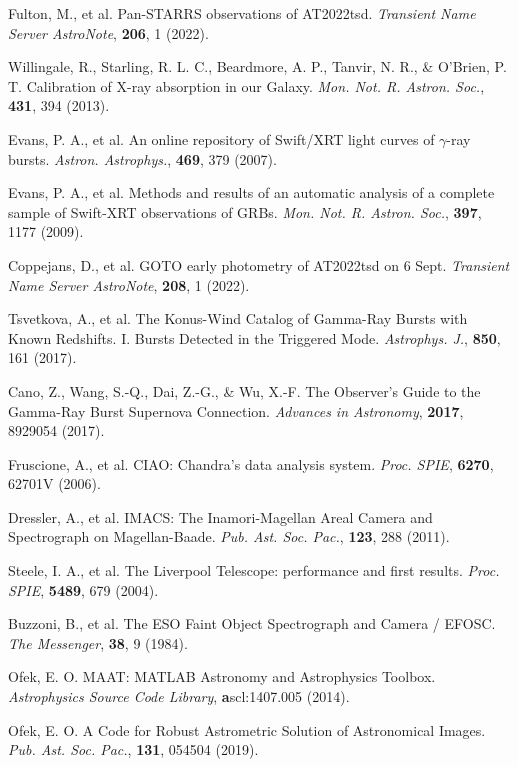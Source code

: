 \documentclass{nature_plusfigure}
\newcommand{\mn}{{Mon. Not. R. Astron. Soc.}}
\newcommand{\mnras}{\mn}
\newcommand{\apj}{{Astrophys. J.}}
\newcommand{\aap}{{Astron. Astrophys.}}
\newcommand{\pasp}{{Pub. Ast. Soc. Pac.}}
\newcommand{\procspie}{Proc. SPIE}
\begin{document}
\begin{methods}
\begin{thebibliography}{10}
 Fulton, M., et al. Pan-STARRS observations of AT2022tsd. \emph{Transient Name Server AstroNote}, \textbf{206}, 1 (2022). 

 Willingale, R., Starling, R. L. C., Beardmore, A. P., Tanvir, N. R., \& O'Brien, P. T. Calibration of X-ray absorption in our Galaxy. \emph{\mnras}, \textbf{431}, 394 (2013). 

 Evans, P. A., et al. An online repository of Swift/XRT light curves of $\gamma$-ray bursts. \emph{\aap}, \textbf{469}, 379 (2007). 

 Evans, P. A., et al. Methods and results of an automatic analysis of a complete sample of Swift-XRT observations of GRBs. \emph{\mnras}, \textbf{397}, 1177 (2009). 

 Coppejans, D., et al. GOTO early photometry of AT2022tsd on 6 Sept. \emph{Transient Name Server AstroNote}, \textbf{208}, 1 (2022). 

 Tsvetkova, A., et al. The Konus-Wind Catalog of Gamma-Ray Bursts with Known Redshifts. I. Bursts Detected in the Triggered Mode. \emph{\apj}, \textbf{850}, 161 (2017). 

 Cano, Z., Wang, S.-Q., Dai, Z.-G., \& Wu, X.-F. The Observer's Guide to the Gamma-Ray Burst Supernova Connection. \emph{Advances in Astronomy}, \textbf{2017}, 8929054 (2017). 

 Fruscione, A., et al. CIAO: Chandra's data analysis system. \emph{\procspie}, \textbf{6270}, 62701V (2006). 

 Dressler, A., et al. IMACS: The Inamori-Magellan Areal Camera and Spectrograph on Magellan-Baade. \emph{\pasp}, \textbf{123}, 288 (2011). 

 Steele, I. A., et al. The Liverpool Telescope: performance and first results. \emph{\procspie}, \textbf{5489}, 679 (2004). 

 Buzzoni, B., et al. The ESO Faint Object Spectrograph and Camera / EFOSC. \emph{The Messenger}, \textbf{38}, 9 (1984). 

 Ofek, E. O. MAAT: MATLAB Astronomy and Astrophysics Toolbox. \emph{Astrophysics Source Code Library}, \textbf ascl:1407.005 (2014). 

 Ofek, E. O. A Code for Robust Astrometric Solution of Astronomical Images. \emph{\pasp}, \textbf{131}, 054504 (2019). 


\end{thebibliography}
\end{methods}
\end{document}
